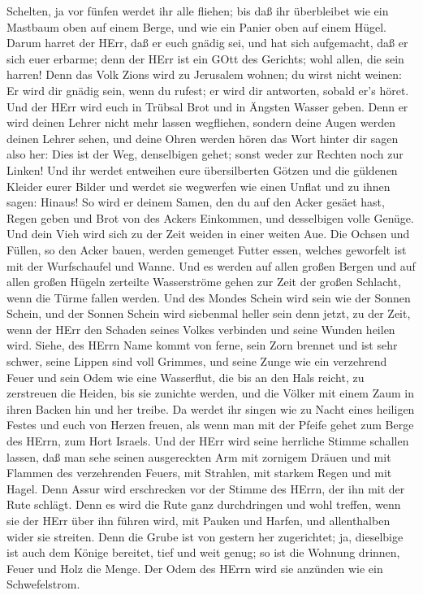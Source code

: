 Schelten, ja vor fünfen werdet ihr alle fliehen; bis daß ihr überbleibet
wie ein Mastbaum oben auf einem Berge, und wie ein Panier oben auf einem
Hügel.  Darum harret der HErr, daß er euch gnädig sei, und
hat sich aufgemacht, daß er sich euer erbarme; denn der HErr ist ein
GOtt des Gerichts; wohl allen, die sein harren!  Denn das
Volk Zions wird zu Jerusalem wohnen; du wirst nicht weinen: Er wird dir
gnädig sein, wenn du rufest; er wird dir antworten, sobald er's höret.
 Und der HErr wird euch in Trübsal Brot und in Ängsten
Wasser geben. Denn er wird deinen Lehrer nicht mehr lassen wegfliehen,
sondern deine Augen werden deinen Lehrer sehen,  und deine
Ohren werden hören das Wort hinter dir sagen also her: Dies ist der Weg,
denselbigen gehet; sonst weder zur Rechten noch zur Linken!
 Und ihr werdet entweihen eure übersilberten Götzen und die
güldenen Kleider eurer Bilder und werdet sie wegwerfen wie einen Unflat
und zu ihnen sagen: Hinaus!  So wird er deinem Samen, den
du auf den Acker gesäet hast, Regen geben und Brot von des Ackers
Einkommen, und desselbigen volle Genüge. Und dein Vieh wird sich zu der
Zeit weiden in einer weiten Aue.  Die Ochsen und Füllen, so
den Acker bauen, werden gemenget Futter essen, welches geworfelt ist mit
der Wurfschaufel und Wanne.  Und es werden auf allen großen
Bergen und auf allen großen Hügeln zerteilte Wasserströme gehen zur Zeit
der großen Schlacht, wenn die Türme fallen werden.  Und des
Mondes Schein wird sein wie der Sonnen Schein, und der Sonnen Schein
wird siebenmal heller sein denn jetzt, zu der Zeit, wenn der HErr den
Schaden seines Volkes verbinden und seine Wunden heilen wird.
 Siehe, des HErrn Name kommt von ferne, sein Zorn brennet
und ist sehr schwer, seine Lippen sind voll Grimmes, und seine Zunge wie
ein verzehrend Feuer  und sein Odem wie eine Wasserflut,
die bis an den Hals reicht, zu zerstreuen die Heiden, bis sie zunichte
werden, und die Völker mit einem Zaum in ihren Backen hin und her
treibe.  Da werdet ihr singen wie zu Nacht eines heiligen
Festes und euch von Herzen freuen, als wenn man mit der Pfeife gehet zum
Berge des HErrn, zum Hort Israels.  Und der HErr wird seine
herrliche Stimme schallen lassen, daß man sehe seinen ausgereckten Arm
mit zornigem Dräuen und mit Flammen des verzehrenden Feuers, mit
Strahlen, mit starkem Regen und mit Hagel.  Denn Assur wird
erschrecken vor der Stimme des HErrn, der ihn mit der Rute schlägt.
 Denn es wird die Rute ganz durchdringen und wohl treffen,
wenn sie der HErr über ihn führen wird, mit Pauken und Harfen, und
allenthalben wider sie streiten.  Denn die Grube ist von
gestern her zugerichtet; ja, dieselbige ist auch dem Könige bereitet,
tief und weit genug; so ist die Wohnung drinnen, Feuer und Holz die
Menge. Der Odem des HErrn wird sie anzünden wie ein Schwefelstrom.

